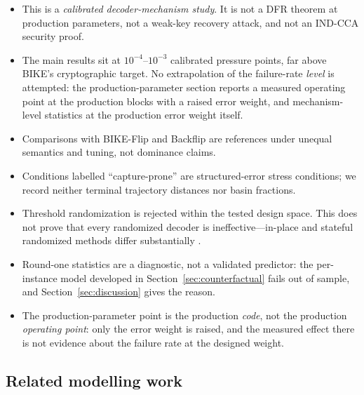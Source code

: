 \documentclass[lettersize,journal]{IEEEtran}
\begin{document}
\begin{itemize}[leftmargin=1.3em,itemsep=0.12em,topsep=0.2em]
\item This is a \emph{calibrated decoder-mechanism study}. It is not a DFR theorem at production parameters, not a weak-key recovery attack, and not an IND-CCA security proof.
\item The main results sit at $10^{-4}$--$10^{-3}$ calibrated pressure points, far above BIKE's cryptographic target. No extrapolation of the failure-rate \emph{level} is attempted: the production-parameter section reports a measured operating point at the production blocks with a raised error weight, and mechanism-level statistics at the production error weight itself.
\item Comparisons with BIKE-Flip and Backflip are references under unequal semantics and tuning, not dominance claims.
\item Conditions labelled ``capture-prone'' are structured-error stress conditions; we record neither terminal trajectory distances nor basin fractions.
\item Threshold randomization is rejected within the tested design space. This does not prove that every randomized decoder is ineffective---in-place and stateful randomized methods differ substantially \cite{baldi2021inplace}.
\item Round-one statistics are a diagnostic, not a validated predictor: the per-instance model developed in Section~\ref{sec:counterfactual} fails out of sample, and Section~\ref{sec:discussion} gives the reason.
\item The production-parameter point is the production \emph{code}, not the production \emph{operating point}: only the error weight is raised, and the measured effect there is not evidence about the failure rate at the designed weight.
\end{itemize}

\subsection{Related modelling work}
\end{document}
